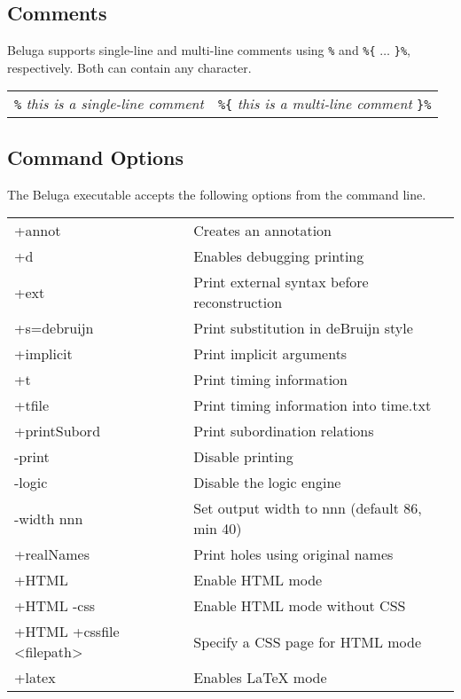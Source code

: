 \documentclass[11pt]{article}
\begin{document}
\subsection{Comments}
Beluga supports single-line and multi-line comments using \texttt{\%} and \texttt{\%\{} $\ldots$ \texttt{\}\%}, respectively. Both can contain any character.
\begin{center}
\begin{tabular}{ | l | r }
  \texttt{\%} \textit{this is a single-line comment} &  \texttt{\%\{} \textit{this is a multi-line comment}  \texttt{\}\%} \\
\end{tabular}
\end{center}


\subsection{Command Options}
The Beluga executable accepts the following options from the command line.\\

\begin{tabular}{ | l l }
+annot & Creates an annotation\\
+d & Enables debugging printing \\ 
+ext &  Print external syntax before reconstruction \\
+s=debruijn & Print substitution in deBruijn style \\
+implicit & Print implicit arguments \\
+t & Print timing information \\
+tfile & Print timing information into time.txt \\
+printSubord & Print subordination relations \\
-print & Disable printing \\
-logic & Disable the logic engine \\
-width nnn & Set output width to nnn (default 86, min 40) \\
+realNames & Print holes using original names\\
+HTML & Enable HTML mode\\
+HTML -css & Enable HTML mode without CSS\\
+HTML +cssfile <filepath> & Specify a CSS page for HTML mode\\
+latex & Enables LaTeX mode\\ 
\end{tabular}
\end{document}
